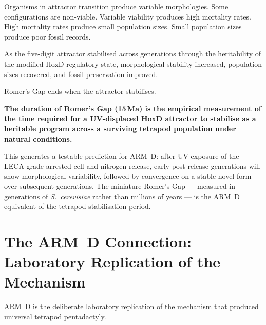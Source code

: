 \documentclass[11pt, a4paper]{article}
\begin{document}
Organisms in attractor transition produce variable
morphologies. Some configurations are non-viable.
Variable viability produces high mortality rates.
High mortality rates produce small population sizes.
Small population sizes produce poor fossil records.

As the five-digit attractor stabilised across
generations through the heritability of the
modified HoxD regulatory state, morphological
stability increased, population sizes recovered,
and fossil preservation improved.

Romer's Gap ends when the attractor stabilises.

\textbf{The duration of Romer's Gap (15\,Ma) is
the empirical measurement of the time required
for a UV-displaced HoxD attractor to stabilise
as a heritable program across a surviving
tetrapod population under natural conditions.}

This generates a testable prediction for ARM~D:
after UV exposure of the LECA-grade arrested cell
and nitrogen release, early post-release generations
will show morphological variability, followed by
convergence on a stable novel form over subsequent
generations.
The miniature Romer's Gap --- measured in
generations of \textit{S.~cerevisiae} rather than
millions of years --- is the ARM~D equivalent
of the tetrapod stabilisation period.

\section{The ARM~D Connection: Laboratory
Replication of the Mechanism}

ARM~D \cite{armD} is the deliberate laboratory
replication of the mechanism that produced
universal tetrapod pentadactyly.
\end{document}

